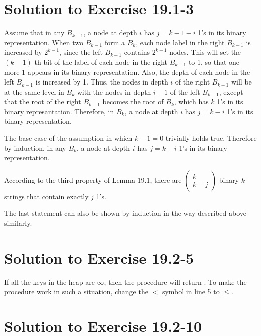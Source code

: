 \documentclass[a4paper, fleqn]{article}
\begin{document}
\section*{Solution to Exercise 19.1-3}

Assume that in any $B_{k-1}$, a node at depth $i$ has $j = k-1-i$ 1's
in its binary representation. When two $B_{k-1}$ form a $B_k$, each
node label in the right $B_{k-1}$ is increased by $2^{k-1}$, since the
left $B_{k-1}$ contains $2^{k-1}$ nodes. This will set the $(k-1)$-th
bit of the label of each node in the right $B_{k-1}$ to 1, so that one
more 1 appears in its binary representation. Also, the depth of each
node in the left $B_{k-1}$ is increased by 1. Thus, the nodes in depth
$i$ of the right $B_{k-1}$ will be at the same level in $B_k$ with the
nodes in depth $i-1$ of the left $B_{k-1}$, except that the root of
the right $B_{k-1}$ becomes the root of $B_k$, which has $k$ 1's in
its binary represantation. Therefore, in $B_k$, a node at depth $i$
has $j = k - i$ 1's in its binary representation.

The base case of the assumption in which $k - 1 = 0$ trivially holds
true. Therefore by induction, in any $B_k$, a node at depth $i$ has
$j = k - i$ 1's in its binary representation.

According to the third property of Lemma 19.1, there are
$\left(\begin{array}{c}k \\ k - j\end{array}\right)$ binary
$k$-strings that contain exactly $j$ 1's.

The last statement can also be shown by induction in the way described
above similarly.






\section*{Solution to Exercise 19.2-5}

If all the keys in the heap are $\infty$, then the procedure will
return . To make the procedure work in such a situation,
change the $<$ symbol in line 5 to $\leq$.






\section*{Solution to Exercise 19.2-10}
\end{document}
